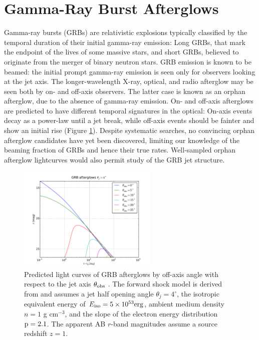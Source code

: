 %
%

\section{Gamma-Ray Burst Afterglows}
\def\secname{\chpname:grbs}\label{sec:\secname}


Gamma-ray bursts (GRBs) are relativistic explosions typically classified
by the temporal duration of their initial gamma-ray emission: Long GRBs,
that mark the endpoint of the lives of some massive stars, and short
GRBs, believed to originate from the merger of binary neutron stars. GRB
emission is known to be beamed: the initial prompt gamma-ray emission is
seen only for observers looking at the jet axis. The longer-wavelength
X-ray, optical, and radio afterglow may be seen both by on- and off-axis
observers.  The latter case is known as an orphan afterglow, due to the
absence of gamma-ray emission. On- and off-axis afterglows are predicted
to have different temporal signatures in the optical: On-axis events
decay as a power-law until a jet break, while off-axis events should be
fainter and show an initial rise (Figure \ref{fig:afterglow_lcs}).
Despite systematic searches, no convincing orphan afterglow candidates
have yet been discovered, limiting our knowledge of the beaming fraction
of GRBs and hence their true rates. Well-sampled orphan afterglow
lightcurves would also permit study of the GRB jet structure.

\begin{figure}[hbt]
\centerline{
\includegraphics[width=0.6\textwidth]{figs/transients/predicted_afterglow_lcs_mag.pdf}
}
\caption{ Predicted light curves of GRB afterglows by off-axis angle
with respect to the jet axis $\theta_{\rm obs}$ \citep[Figure
8.8,][]{2009arXiv0912.0201L}. The forward shock model is derived from
\citet{2002ApJ...576..120T} and assumes a jet half opening angle
$\theta_j = 4^\circ$, the isotropic equivalent energy of $E_{\rm iso} =
5\times10^{53} \rm erg$, ambient medium density $n = 1$ g cm$^{-3}$, and
the slope of the electron energy distribution $\rm p = 2.1$. The
apparent AB $r$-band magnitudes assume a source redshift $z = 1$. }
\label{fig:afterglow_lcs}
\end{figure}


